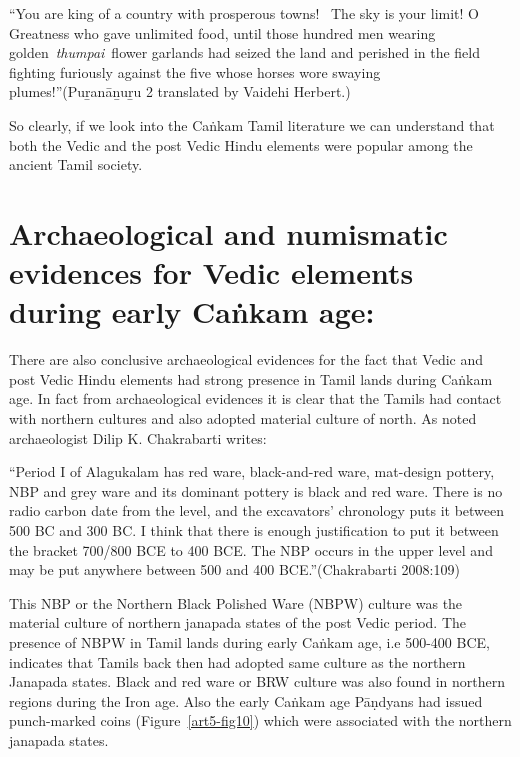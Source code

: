 \begin{myquote}
“You are king of a country with prosperous towns!  The sky is your limit! O Greatness who gave unlimited food, until those hundred men wearing golden \textit{thumpai} flower garlands had seized the land and perished in the field fighting furiously against the five whose horses wore swaying plumes!”\hfill (Puṟanāṉuṟu 2 translated by Vaidehi Herbert.)
\end{myquote}

So clearly, if we look into the Caṅkam Tamil literature we can understand that both the Vedic and the post Vedic Hindu elements were popular among the ancient Tamil society.


\section*{Archaeological and numismatic evidences for Vedic elements during early Caṅkam age:}

There are also conclusive archaeological evidences for the fact that Vedic and post Vedic Hindu elements had strong presence in Tamil lands during Caṅkam age. In fact from archaeological evidences it is clear that the Tamils had contact with northern cultures and also adopted material culture of north. As noted archaeologist Dilip K. Chakrabarti writes:

\begin{myquote}
“Period I of Alagukalam has red ware, black-and-red ware, mat-design pottery, NBP and grey ware and its dominant pottery is black and red ware. There is no radio carbon date from the level, and the excavators’ chronology puts it between 500 BC and 300 BC. I think that there is enough justification to put it between the bracket 700/800 BCE to 400 BCE. The NBP occurs in the upper level and may be put anywhere between 500 and 400 BCE.”\hfill (Chakrabarti 2008:109)
\end{myquote}

This NBP or the Northern Black Polished Ware (NBPW) culture was the material culture of northern janapada states of the post Vedic period. The presence of NBPW in Tamil lands during early Caṅkam age, i.e 500-400 BCE, indicates that Tamils back then had adopted same culture as the northern Janapada states. Black and red ware or BRW culture was also found in northern regions during the Iron age. Also the early Caṅkam age Pāṇdyans had issued punch-marked coins (Figure~\ref{art5-fig10}) which were associated with the northern janapada states.

